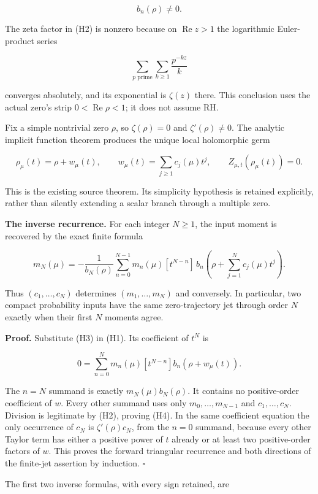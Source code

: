 \[
b_n(\rho)\ne0.\tag{H2}
\]

The zeta factor in (H2) is nonzero because on \(\operatorname{Re} z>1\) the logarithmic Euler-product series

\[
\sum_{p\text{ prime}}\sum_{k\ge1}\frac{p^{-kz}}{k}
\]

converges absolutely, and its exponential is \(\zeta (z)\) there. This conclusion uses the actual zero's strip \(0<\operatorname{Re} \rho <1\); it does not assume RH.

Fix a simple nontrivial zero \(\rho\), so \(\zeta (\rho )=0\) and \(\zeta '(\rho )\ne 0\). The analytic implicit function theorem produces the unique local holomorphic germ

\[
\rho_\mu(t)=\rho+w_\mu(t),\qquad
w_\mu(t)=\sum_{j\ge1}c_j(\mu)t^j,\qquad
Z_{\mu,t}(\rho_\mu(t))=0.
\tag{H3}
\]

This is the existing source theorem. Its simplicity hypothesis is retained explicitly, rather than silently extending a scalar branch through a multiple zero.

\textbf{The inverse recurrence.} For each integer \(N\ge 1\), the input moment is recovered by the exact finite formula

\[
\boxed{
m_N(\mu)=-\frac{1}{b_N(\rho)}
\sum_{n=0}^{N-1}m_n(\mu)
[t^{N-n}]\,b_n\!\left(\rho+\sum_{j=1}^{N}c_j(\mu)t^j\right).
}\tag{H4}
\]

Thus \((c_1,\ldots ,c_N)\) determines \((m_1,\ldots ,m_N)\) and conversely. In particular, two compact probability inputs have the same zero-trajectory jet through order \(N\) exactly when their first \(N\) moments agree.

\textbf{Proof.} Substitute (H3) in (H1). Its coefficient of \(t^N\) is

\[
0=\sum_{n=0}^{N}m_n(\mu)
[t^{N-n}]b_n(\rho+w_\mu(t)).
\]

The \(n=N\) summand is exactly \(m_N(\mu )b_N(\rho )\). It contains no positive-order coefficient of \(w\). Every other summand uses only \(m_0,\ldots ,m_{N-1}\) and \(c_1,\ldots ,c_N\). Division is legitimate by (H2), proving (H4). In the same coefficient equation the only occurrence of \(c_N\) is \(\zeta '(\rho )c_N\), from the \(n=0\) summand, because every other Taylor term has either a positive power of \(t\) already or at least two positive-order factors of \(w\). This proves the forward triangular recurrence and both directions of the finite-jet assertion by induction. \(\square\)

The first two inverse formulas, with every sign retained, are

